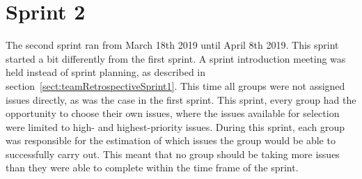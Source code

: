 \chapter{Sprint 2}
The second sprint ran from March 18th 2019 until April 8th 2019.
This sprint started a bit differently from the first sprint. A sprint introduction meeting was held instead of sprint planning, as described in section~\ref{sect:teamRetrospectiveSprint1}. This time all groups were not assigned issues directly, as was the case in the first sprint. This sprint, every group had the opportunity to choose their own issues, where the issues available for selection were limited to high- and highest-priority issues. During this sprint, each group was responsible for the estimation of which issues the group would be able to successfully carry out. This meant that no group should be taking more issues than they were able to complete within the time frame of the sprint.


